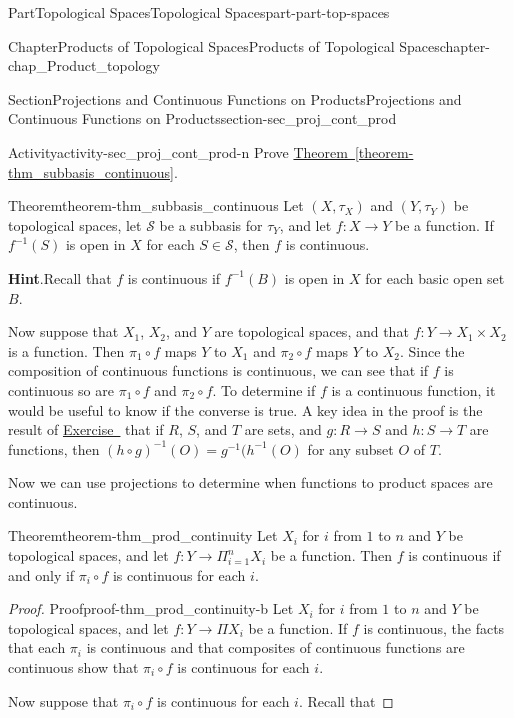 \documentclass[oneside,10pt,]{book}
\newcommand{\blocktitlefont}{\relax}
\newcommand{\xreffont}{\relax}
\numberwithin{equation}{chapter}
\newcommand{\CS}{\mathcal{S}}
\begin{document}
\begin{partptx}{Part}{Topological Spaces}{}{Topological Spaces}{}{}{part-part-top-spaces}
\begin{chapterptx}{Chapter}{Products of Topological Spaces}{}{Products of Topological Spaces}{}{}{chapter-chap_Product_topology}
\begin{sectionptx}{Section}{Projections and Continuous Functions on Products}{}{Projections and Continuous Functions on Products}{}{}{section-sec_proj_cont_prod}
\begin{activity}{Activity}{}{activity-sec_proj_cont_prod-n}%
Prove \hyperref[theorem-thm_subbasis_continuous]{Theorem~{\xreffont\ref{theorem-thm_subbasis_continuous}}}.%
\begin{theorem}{Theorem}{}{}{theorem-thm_subbasis_continuous}%
Let \((X, \tau_X)\) and \((Y, \tau_Y)\) be topological spaces, let \(\CS\) be a subbasis for \(\tau_Y\), and let \(f: X \to Y\) be a function. If \(f^{-1}(S)\) is open in \(X\) for each \(S \in \CS\), then \(f\) is continuous.%
\end{theorem}
\par\smallskip%
\noindent\textbf{\blocktitlefont Hint}.\hypertarget{hint-sec_proj_cont_prod-n-b}{}\quad{}Recall that \(f\) is continuous if \(f^{-1}(B)\) is open in \(X\) for each basic open set \(B\).%
\end{activity}%
Now suppose that \(X_1\), \(X_2\), and \(Y\) are topological spaces, and that \(f: Y \to X_1 \times X_2\) is a function. Then \(\pi_1 \circ f\) maps \(Y\) to \(X_1\) and \(\pi_2 \circ f\) maps \(Y\) to \(X_2\). Since the composition of continuous functions is continuous, we can see that if \(f\) is continuous so are \(\pi_1\circ f\) and \(\pi_2 \circ f\). To determine if \(f\) is a continuous function, it would be useful to know if the converse is true. A key idea in the proof is the result of \hyperlink{exercise-ex_inverse_composite_sets}{Exercise~{\xreffont 9}} that if \(R\), \(S\), and \(T\) are sets, and \(g: R \to S\) and \(h : S \to T\) are functions, then \((h \circ g)^{-1}(O) = g^{-1}(h^{-1}(O)\) for any subset \(O\) of \(T\).%
\par
Now we can use projections to determine when functions to product spaces are continuous.%
\begin{theorem}{Theorem}{}{}{theorem-thm_prod_continuity}%
Let \(X_i\) for \(i\) from \(1\) to \(n\) and \(Y\) be topological spaces, and let \(f: Y \to \Pi_{i=1}^n X_i\) be a function. Then \(f\) is continuous if and only if \(\pi_i \circ f\) is continuous for each \(i\).%
\end{theorem}
\begin{proof}{Proof}{}{proof-thm_prod_continuity-b}
Let \(X_i\) for \(i\) from \(1\) to \(n\) and \(Y\) be topological spaces, and let \(f: Y \to \Pi X_i\) be a function. If \(f\) is continuous, the facts that each \(\pi_i\) is continuous and that composites of continuous functions are continuous show that \(\pi_i \circ f\) is continuous for each \(i\).%
\par
Now suppose that \(\pi_i \circ f\) is continuous for each \(i\). Recall that%

\end{proof}
\end{sectionptx}
\end{chapterptx}
\end{partptx}
\end{document}
